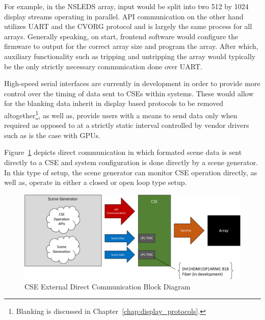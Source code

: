         For example, in the NSLEDS array, input would be split into two 512 by 1024 display streams operating in parallel. API communication on the other hand utilizes UART and the CVORG protocol and is largely the same process for all arrays. Generally speaking, on start, frontend software would configure the firmware to output for the correct array size and program the array. After which, auxiliary functionality such as tripping and untripping the array would typically be the only strictly necessary communication done over UART.

        High-speed serial interfaces are currently in development in order to provide more control over the timing of data sent to CSEs within systems. These would allow for the blanking data inherit in display based protocols to be removed altogether\footnote{Blanking is discussed in Chapter~\ref{chap:display_protocols}.}, as well as, provide users with a means to send data only when required as opposed to at a strictly static interval controlled by vendor drivers such as is the case with GPUs.

        Figure~\ref{fig:external_cse_comm_direct} depicts direct communication in which formated scene data is sent directly to a CSE and system configuration is done directly by a scene generator. In this type of setup, the scene generator can monitor CSE operation directly, as well as, operate in either a closed or open loop type setup\cite{nagrath2009control,frank2018control}.

        \begin{figure}
            \centering
            \includegraphics[width=1.0\textwidth]{fig/external_cse_comm_direct.pdf}
            \caption{CSE External Direct Communication Block Diagram}
            \label{fig:external_cse_comm_direct}
        \end{figure}

